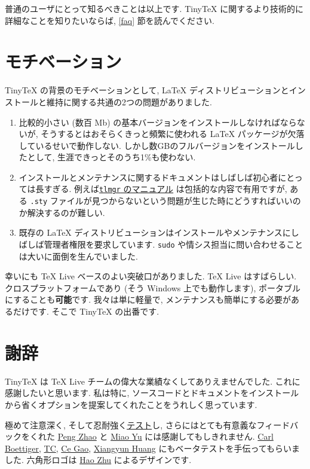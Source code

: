 \documentclass[
  xelatex,ja=standard,jafont=noto]{bxjsreport}
\begin{document}
普通のユーザにとって知るべきことは以上です. TinyTeX
に関するより技術的に詳細なことを知りたいならば, \ref{faq}
節を読んでください.

\hypertarget{ux30e2ux30c1ux30d9ux30fcux30b7ux30e7ux30f3}{%
\section{モチベーション}\label{ux30e2ux30c1ux30d9ux30fcux30b7ux30e7ux30f3}}

TinyTeX の背景のモチベーションとして, LaTeX
ディストリビューションとインストールと維持に関する共通の2つの問題がありました.

\begin{enumerate}
\def\labelenumi{\arabic{enumi}.}
\item
  比較的小さい (数百 Mb)
  の基本バージョンをインストールしなければならないが,
  そうするとはおそらくきっと頻繁に使われる LaTeX
  パッケージが欠落しているせいで動作しない.
  しかし数GBのフルバージョンをインストールしたとして,
  生涯できっとそのうち1\%も使わない.
\item
  インストールとメンテナンスに関するドキュメントはしばしば初心者にとっては長すぎる.
  例えば\href{https://www.tug.org/texlive/doc/tlmgr.html}{\texttt{tlmgr}
  のマニュアル} は包括的な内容で有用ですが, ある \texttt{.sty}
  ファイルが見つからないという問題が生じた時にどうすればいいのか解決するのが難しい.
\item
  既存の LaTeX
  ディストリビューションはインストールやメンテナンスにしばしば管理者権限を要求しています.
  \texttt{sudo}
  や情シス担当に問い合わせることは大いに面倒を生んでいました.
\end{enumerate}

幸いにも TeX Live ベースのよい突破口がありました. TeX Live はすばらしい.
クロスプラットフォームであり (そう Windows 上でも動作します),
ポータブルにすることも\textbf{可能}です. 我々は単に軽量で,
メンテナンスも簡単にする必要があるだけです. そこで TinyTeX の出番です.

\hypertarget{ux8b1dux8f9e}{%
\section{謝辞}\label{ux8b1dux8f9e}}

TinyTeX は TeX Live チームの偉大な業績なくしてありえませんでした.
これに感謝したいと思います. 私は特に,
ソースコードとドキュメントをインストールから省くオプションを提案してくれたことをうれしく思っています.

極めて注意深く,
そして忍耐強く\href{https://d.cosx.org/d/419672}{テスト}し,
さらにはとても有意義なフィードバックをくれた
\href{http://www.pzhao.org}{Peng Zhao} と \href{https://yufree.cn}{Miao
Yu} には感謝してもしきれません.
\href{https://www.carlboettiger.info}{Carl Boettiger},
\href{http://tc.rbind.io}{TC}, \href{https://github.com/gaocegege}{Ce
Gao}, \href{https://github.com/XiangyunHuang}{Xiangyun Huang}
にもベータテストを手伝ってもらいました. 六角形ロゴは
\href{https://github.com/haozhu233}{Hao Zhu} によるデザインです.
\end{document}
